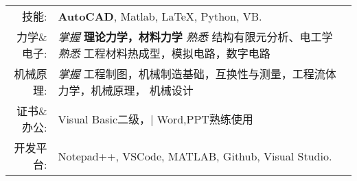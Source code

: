 %
%


 
%
\renewcommand{\arraystretch}{1.1}

\begin{tabular}{rl} 
	\textsc{技能:}      &  \textbf{AutoCAD}, Matlab, \LaTeX, Python, VB.\\  
	\textsc{力学\&电子:} 		&  \emph{掌握} \textbf{理论力学，材料力学} \emph{熟悉}  结构有限元分析、电工学   \emph{熟悉}  工程材料热成型，模拟电路，数字电路 \\
	\textsc{机械原理:}	   &  \emph{掌握}  工程制图，机械制造基础，互换性与测量，工程流体力学，机械原理， 机械设计  \\
	\textsc{证书\&办公:}	    &  Visual Basic二级，| Word,PPT熟练使用\\
    \textsc{开发平台:}	    & Notepad++, VSCode, MATLAB, Github, Visual Studio.
\end{tabular}
